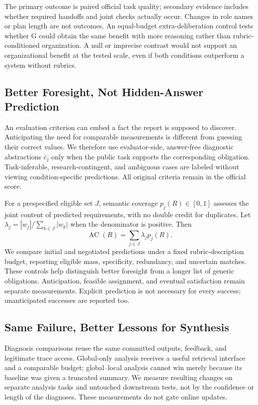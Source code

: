 \documentclass[11pt]{article}
\begin{document}
The primary outcome is paired official task quality; secondary evidence includes whether required handoffs and joint checks actually occur. Changes in role names or plan length are not outcomes. An equal-budget extra-deliberation control tests whether G could obtain the same benefit with more reasoning rather than rubric-conditioned organization. A null or imprecise contrast would not support an organizational benefit at the tested scale, even if both conditions outperform a system without rubrics.

\subsection{Better Foresight, Not Hidden-Answer Prediction}
\label{sec:foresight}

An evaluation criterion can embed a fact the report is supposed to discover. Anticipating the need for comparable measurements is different from guessing their correct values. We therefore use evaluator-side, answer-free diagnostic abstractions $\bar c_j$ only when the public task supports the corresponding obligation. Task-inferable, research-contingent, and ambiguous cases are labeled without viewing condition-specific predictions. All original criteria remain in the official score.

For a prespecified eligible set $J$, semantic coverage $p_j(R)\in[0,1]$ assesses the joint content of predicted requirements, with no double credit for duplicates. Let $\lambda_j=|w_j|/\sum_{k\in J}|w_k|$ when the denominator is positive. Then
\begin{equation}
\operatorname{AC}(R)=\sum_{j\in J}\lambda_jp_j(R).
\end{equation}
We compare initial and negotiated predictions under a fixed rubric-description budget, reporting eligible mass, specificity, redundancy, and uncertain matches. These controls help distinguish better foresight from a longer list of generic obligations. Anticipation, feasible assignment, and eventual satisfaction remain separate measurements. Explicit prediction is not necessary for every success; unanticipated successes are reported too.

\subsection{Same Failure, Better Lessons for Synthesis}
\label{sec:repairtest}

Diagnosis comparisons reuse the same committed outputs, feedback, and legitimate trace access. Global-only analysis receives a useful retrieval interface and a comparable budget; global--local analysis cannot win merely because its baseline was given a truncated summary. We measure resulting changes on separate analysis tasks and untouched downstream tests, not by the confidence or length of the diagnoses. These measurements do not gate online updates.
\end{document}
